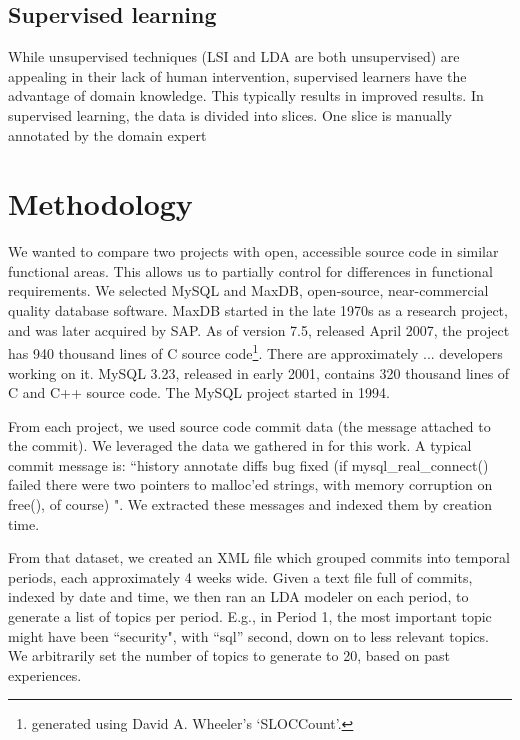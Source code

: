 \documentclass[10pt, conference, compsocconf]{IEEEtran}
\begin{document}
\subsection{Supervised learning}
While unsupervised techniques (LSI and LDA are both unsupervised) are appealing in their lack of human intervention, supervised learners have the advantage of domain knowledge. This typically results in improved results. In supervised learning, the data is divided into slices. One slice is manually annotated by the domain expert

 
\section{Methodology}


We wanted to compare two projects with open, accessible source code in similar functional areas. This allows us to partially control for differences in functional requirements. We selected MySQL and MaxDB, open-source, near-commercial quality database software. MaxDB started in the late 1970s as a research project, and was later acquired by SAP. As of version 7.5, released April 2007, the project has 940 thousand lines of C source code\footnote{generated using David A. Wheeler's `SLOCCount'.}. There are approximately ... developers working on it. MySQL 3.23, released in early 2001, contains 320 thousand lines of C and C++ source code. The MySQL project started in 1994.

From each project, we used source code commit data (the message attached to the commit). We leveraged the data we gathered in \cite{Hindle09ICSM} for this work. A typical commit message is: ``history annotate diffs bug fixed (if mysql_real_connect() failed there were two pointers to malloc'ed strings, with memory corruption on free(), of course) ". We extracted these messages and indexed them by creation time. 

From that dataset, we created an XML file which grouped commits into temporal periods, each approximately 4 weeks wide. Given a text file full of commits, indexed by date and time, we then ran an LDA modeler on each period, to generate a list of topics per period. E.g., in Period 1, the most important topic might have been ``security", with ``sql'' second, down on to less relevant topics. We arbitrarily set the number of topics to generate to 20, based on past experiences.
\end{document}
